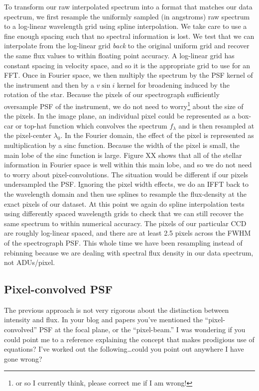 \documentclass[preprint]{aastex} %
\begin{document}
To transform our raw interpolated spectrum into a format that matches our data spectrum, we first resample the uniformly sampled (in angstroms) raw spectrum to a log-linear wavelength grid using spline interpolation. We take care to use a fine enough spacing such that no spectral information is lost. We test that we can interpolate from the log-linear grid \emph{back} to the original uniform grid and recover the same flux values to within floating point accuracy. A log-linear grid has constant spacing in velocity space, and so it is the appropriate grid to use for an FFT. Once in Fourier space, we then multiply the spectrum by the PSF kernel of the instrument and then by a $v \sin i$ kernel for broadening induced by the rotation of the star. Because the pixels of our spectrograph sufficiently oversample PSF of the instrument, we do not need to worry\footnote{or so I currently think, please correct me if I am wrong!} about the size of the pixels. In the image plane, an individual pixel could be represented as a box-car or top-hat function which convolves the spectrum $f_\lambda$ and is then resampled at the pixel-center $\lambda_0$. In the Fourier domain, the effect of the pixel is represented as multiplication by a sinc function. Because the width of the pixel is small, the main lobe of the sinc function is large. Figure XX shows that all of the stellar information in Fourier space is well within this main lobe, and so we do not need to worry about pixel-convolutions. The situation would be different if our pixels undersampled the PSF. Ignoring the pixel width effects, we do an IFFT back to the wavelength domain and then use splines to resample the flux-density at the exact pixels of our dataset. At this point we again do spline interpolation tests using differently spaced wavelength grids to check that we can still recover the same spectrum to within numerical accuracy. The pixels of our particular CCD are roughly log-linear spaced, and there are at least 2.5 pixels across the FWHM of the spectrograph PSF. This whole time we have been resampling instead of rebinning because we are dealing with spectral flux density in our data spectrum, not ADUs/pixel.

\subsection{Pixel-convolved PSF}
The previous approach is not very rigorous about the distinction between intensity and flux. In your blog and papers you've mentioned the ``pixel-convolved'' PSF at the focal plane, or the ``pixel-beam.'' I was wondering if you could point me to a reference explaining the concept that makes prodigious use of equations? I've worked out the following\ldots could you point out anywhere I have gone wrong?
\end{document}

